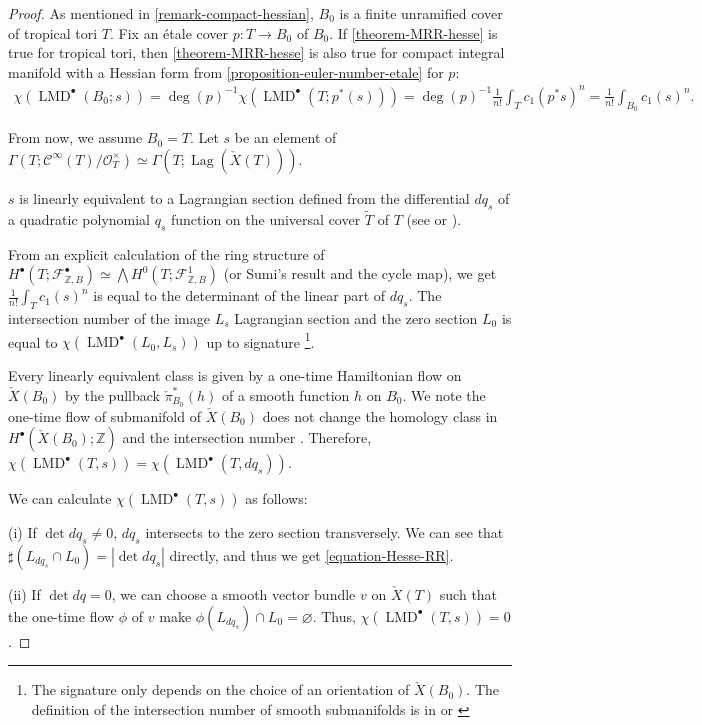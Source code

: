 \documentclass[a4paper,dvipdfmx,reqno,12pt]{amsart}
\theoremstyle{definition}
\newcommand{\emp}{\varnothing}%
\newcommand{\Z}{\mathbb{Z}}%
\newcommand{\mcal}[1]{\mathcal{#1}}%
\newcommand{\opn}[1]{\operatorname{#1}}
\newcommand{\myfootnote}[1]{\hspace{-5pt}\footnote{#1}}
\numberwithin{equation}{section}
\begin{document}
\begin{proof}

As mentioned in \cref{remark-compact-hessian},
$B_0$ is a finite unramified cover of tropical tori $T$.
Fix an \'etale cover $p:T \to B_0$ of $B_0$.
If \cref{theorem-MRR-hesse} is true for tropical tori,
then \cref{theorem-MRR-hesse} is also true for compact
integral manifold with a Hessian form from
\cref{proposition-euler-number-etale} for $p$:
\begin{align}
\chi(\opn{LMD}^{\bullet}(B_0;s))
=\opn{deg}(p)^{-1}\chi(\opn{LMD}^{\bullet}(T;p^{*}(s)))
=\opn{deg}(p)^{-1}\frac{1}{n!}\int_T c_1(p^{*}s)^{n}
=\frac{1}{n!}\int_{B_0}c_1(s)^{n}.
\end{align}

From now, we assume $B_0=T$.
Let $s$ be an element of 
$\Gamma(T;\mcal{C}^{\infty}(T)/\mcal{O}_{T}^{\times})\simeq
\Gamma(T;\opn{Lag}(\check{X}(T)))$.

$s$ is linearly equivalent to a Lagrangian section
defined from the differential $dq_s$ of a quadratic polynomial
$q_s$ function on the universal cover $\tilde{T}$ of $T$
(see \cite{mikhalkinTropicalCurvesTheir2008a} or 
\cite[3.3]{MR4229604}).

From an explicit calculation of the ring structure of
$H^{\bullet}(T;\mathcal{F}_{\mathbb{Z},B}^{\bullet})
\simeq \bigwedge H^{0}(T;\mathcal{F}_{\mathbb{Z},B}^{1})$
(or Sumi's result
\cite[Theorem 47]{MR4229604} and the cycle map), 
we get 
$\frac{1}{n!}\int_{T}c_1(s)^{n}$ is equal to the determinant
of the linear part of $dq_s$. The intersection number of the image $L_s$ Lagrangian
section and the zero section $L_0$ is equal to
$\chi(\opn{LMD}^{\bullet}(L_0,L_s))$ up to 
signature
\myfootnote{The signature only depends on
the choice of 
an orientation of $\check{X}(B_0)$. 
The definition of the intersection number of smooth 
submanifolds is in \cite[5.2]{MR1336822} or 
\cite[0.4]{griffithsPrinciplesAlgebraicGeometry1994a}}. 

Every linearly equivalent 
class is given by a one-time Hamiltonian flow on 
$\check{X}(B_0)$ by the pullback $\check{\pi}_{B_0}^{*}(h)$
of a smooth function $h$ on $B_0$.
We note the one-time flow of submanifold of $\check{X}(B_0)$ does not change
the homology class in $H^{\bullet}(\check{X}(B_0);\Z)$ and
the intersection number \cite[5.2.1. Theorem]{MR1336822}.
Therefore, 
$\chi(\opn{LMD}^{\bullet}(T,s))=
\chi(\opn{LMD}^{\bullet}(T,dq_{s}))$.

We can calculate $\chi(\opn{LMD}^{\bullet}(T,s))$ as follows:

(i) If $\det dq_s\ne 0$, $dq_s$ intersects to 
the zero section transversely. We can see that 
$\sharp(L_{dq_s}\cap L_0)=|\det dq_s|$ directly, and thus
we get \cref{equation-Hesse-RR}. 

(ii) If $\det dq=0$, we can choose a smooth vector bundle $v$ on 
$\check{X}(T)$ such that the one-time flow $\phi$ of $v$ make 
$\phi(L_{dq_s})\cap L_0=\emp$. 
Thus, $\chi(\opn{LMD}^{\bullet}(T,s))=0$.
\end{proof}
\end{document}
